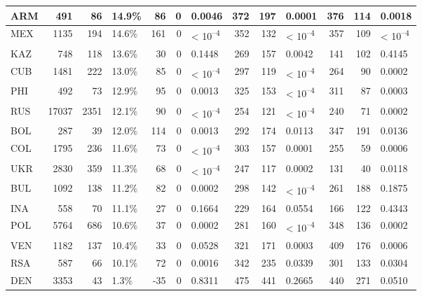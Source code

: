 \begin{tabular}{l|r|r|l|r|r|l|r|r|l|r|r|l}
\hline
ARM & 491 & 86 & 14.9\% & 86 & 0 & 0.0046 & 372 & 197 & 0.0001 & 376 & 114 & 0.0018\\
\hline
MEX & 1135 & 194 & 14.6\% & 161 & 0 & < 10\textsuperscript{--4} & 352 & 132 & < 10\textsuperscript{--4} & 357 & 109 & < 10\textsuperscript{--4}\\
\hline
KAZ & 748 & 118 & 13.6\% & 30 & 0 & 0.1448 & 269 & 157 & 0.0042 & 141 & 102 & 0.4145\\
\hline
CUB & 1481 & 222 & 13.0\% & 85 & 0 & < 10\textsuperscript{--4} & 297 & 119 & < 10\textsuperscript{--4} & 264 & 90 & 0.0002\\
\hline
PHI & 492 & 73 & 12.9\% & 95 & 0 & 0.0013 & 325 & 153 & < 10\textsuperscript{--4} & 311 & 87 & 0.0003\\
\hline
RUS & 17037 & 2351 & 12.1\% & 90 & 0 & < 10\textsuperscript{--4} & 254 & 121 & < 10\textsuperscript{--4} & 240 & 71 & 0.0002\\
\hline
BOL & 287 & 39 & 12.0\% & 114 & 0 & 0.0013 & 292 & 174 & 0.0113 & 347 & 191 & 0.0136\\
\hline
COL & 1795 & 236 & 11.6\% & 73 & 0 & < 10\textsuperscript{--4} & 303 & 157 & 0.0001 & 255 & 59 & 0.0006\\
\hline
UKR & 2830 & 359 & 11.3\% & 68 & 0 & < 10\textsuperscript{--4} & 247 & 117 & 0.0002 & 131 & 40 & 0.0118\\
\hline
BUL & 1092 & 138 & 11.2\% & 82 & 0 & 0.0002 & 298 & 142 & < 10\textsuperscript{--4} & 261 & 188 & 0.1875\\
\hline
INA & 558 & 70 & 11.1\% & 27 & 0 & 0.1664 & 229 & 164 & 0.0554 & 166 & 122 & 0.4343\\
\hline
POL & 5764 & 686 & 10.6\% & 37 & 0 & 0.0002 & 281 & 160 & < 10\textsuperscript{--4} & 348 & 136 & 0.0002\\
\hline
VEN & 1182 & 137 & 10.4\% & 33 & 0 & 0.0528 & 321 & 171 & 0.0003 & 409 & 176 & 0.0006\\
\hline
RSA & 587 & 66 & 10.1\% & 72 & 0 & 0.0016 & 342 & 235 & 0.0339 & 301 & 133 & 0.0304\\
\hline
DEN & 3353 & 43 & 1.3\% & -35 & 0 & 0.8311 & 475 & 441 & 0.2665 & 440 & 271 & 0.0510\\
\hline
\end{tabular}
